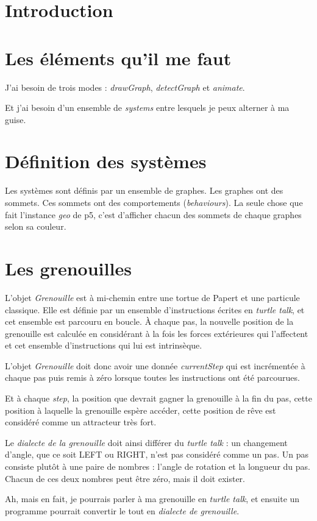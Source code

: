 
\section{Introduction}

\section{Les éléments qu'il me faut}
J'ai besoin de trois modes : \textit{drawGraph}, \textit{detectGraph} et \textit{animate}.

Et j'ai besoin d'un ensemble de \textit{systems} entre lesquels je peux alterner à ma guise.

\section{Définition des systèmes}

Les systèmes sont définis par un ensemble de graphes. Les graphes ont des sommets. Ces sommets ont des comportements (\textit{behaviours}). La seule chose que fait l'instance \textit{geo} de p5, c'est d'afficher chacun des sommets de chaque graphes selon sa couleur.

\newpage
\section{Les grenouilles}

L'objet \textit{Grenouille} est à mi-chemin entre une tortue de Papert et une particule classique. Elle est définie par un ensemble d'instructions écrites en \textit{turtle talk}, et cet ensemble est parcouru en boucle. À chaque pas, la nouvelle position de la grenouille est calculée en considérant à la fois les forces extérieures qui l'affectent et cet ensemble d'instructions qui lui est intrinsèque.

L'objet \textit{Grenouille} doit donc avoir une donnée \textit{currentStep} qui est incrémentée à chaque pas puis remis à zéro lorsque toutes les instructions ont été parcourues.

Et à chaque \textit{step}, la position que devrait gagner la grenouille à la fin du pas, cette position à laquelle la grenouille espère accéder, cette position de rêve est considéré comme un attracteur très fort.

Le \textit{dialecte de la grenouille} doit ainsi différer du \textit{turtle talk} : un changement d'angle, que ce soit LEFT ou RIGHT, n'est pas considéré comme un pas. Un pas consiste plutôt à une paire de nombres : l'angle de rotation et la longueur du pas. Chacun de ces deux nombres peut être zéro, mais il doit exister.

Ah, mais en fait, je pourrais parler à ma grenouille en \textit{turtle talk}, et ensuite un programme pourrait convertir le tout en \textit{dialecte de grenouille}.

